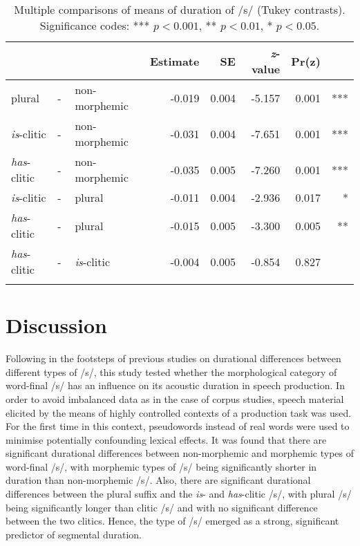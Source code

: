 \begin{table}\fontsize{10}{11}
\caption{Multiple comparisons of means of duration of /s/ (Tukey contrasts). Significance codes: *** $p < 0.001$, ** $p < 0.01$, * $p < 0.05$.}
\label{tab:4.11}
\centering
\begin{tabular}{lllrrrrr} 
\lsptoprule
~                   & ~ & ~                  & Estimate & SE    & \textit{z}-value & Pr(\textbar{}z\textbar{}) & ~    \\ 
\midrule
plural              & - & non-morphemic      & -0.019   & 0.004 & -5.157           & 
  0.001                  & ***  \\
\textit{is}-clitic  & - & non-morphemic      & -0.031   & 0.004 & -7.651           &  0.001                    & ***  \\
\textit{has}-clitic & - & non-morphemic      & -0.035   & 0.005 & -7.260           & 
  0.001                  & ***  \\
\textit{is}-clitic  & - & plural             & -0.011   & 0.004 & -2.936           & 0.017                     & *    \\
\textit{has}-clitic & - & plural             & -0.015   & 0.005 & -3.300           & 0.005                     & **   \\
\textit{has}-clitic & - & \textit{is}-clitic & -0.004   & 0.005 & -0.854           & 0.827                     & ~    \\
\lspbottomrule
\end{tabular}
\end{table}



\section{Discussion}\label{section04_4}

Following in the footsteps of previous studies on durational differences between different types of /s/, this study tested whether the morphological category of word-final /s/ has an influence on its acoustic duration in speech production. In order to avoid imbalanced data as in the case of corpus studies, speech material elicited by the means of highly controlled contexts of a production task was used. For the first time in this context, pseudowords instead of real words were used to minimise potentially confounding lexical effects. It was found that there are significant durational differences between non-morphemic and morphemic types of word-final /s/, with morphemic types of /s/ being significantly shorter in duration than non-morphemic /s/. Also, there are significant durational differences between the plural suffix and the \textit{is}- and \textit{has}-clitic /s/, with plural /s/ being significantly longer than clitic /s/ and with no significant difference between the two clitics. Hence, the type of /s/ emerged as a strong, significant predictor of segmental duration.

